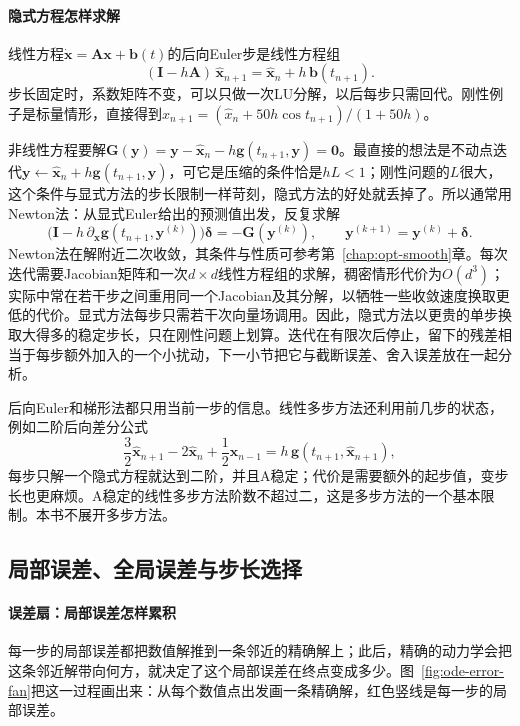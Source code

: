 \paragraph{隐式方程怎样求解}
线性方程$\dot{\bm x}=\bm A\bm x+\bm b(t)$的后向Euler步是线性方程组
\[
  (\bm I-h\bm A)\,\widehat{\bm x}_{n+1}=\widehat{\bm x}_n+h\,\bm b(t_{n+1}).
\]
步长固定时，系数矩阵不变，可以只做一次LU分解，以后每步只需回代。刚性例子是标量情形，直接得到$\widehat x_{n+1}=(\widehat x_n+50h\cos t_{n+1})/(1+50h)$。

非线性方程要解$\bm G(\bm y)=\bm y-\widehat{\bm x}_n-h\bm g(t_{n+1},\bm y)=\bm0$。最直接的想法是不动点迭代$\bm y\leftarrow\widehat{\bm x}_n+h\bm g(t_{n+1},\bm y)$，可它是压缩的条件恰是$hL<1$；刚性问题的$L$很大，这个条件与显式方法的步长限制一样苛刻，隐式方法的好处就丢掉了。所以通常用Newton法：从显式Euler给出的预测值出发，反复求解
\[
  \bigl(\bm I-h\,\partial_{\bm x}\bm g(t_{n+1},\bm y^{(k)})\bigr)\bm\delta=-\bm G(\bm y^{(k)}),\qquad\bm y^{(k+1)}=\bm y^{(k)}+\bm\delta.
\]
Newton法在解附近二次收敛，其条件与性质可参考第~\ref{chap:opt-smooth}章。每次迭代需要Jacobian矩阵和一次$d\times d$线性方程组的求解，稠密情形代价为$O(d^3)$；实际中常在若干步之间重用同一个Jacobian及其分解，以牺牲一些收敛速度换取更低的代价。显式方法每步只需若干次向量场调用。因此，隐式方法以更贵的单步换取大得多的稳定步长，只在刚性问题上划算。迭代在有限次后停止，留下的残差相当于每步额外加入的一个小扰动，下一小节把它与截断误差、舍入误差放在一起分析。

后向Euler和梯形法都只用当前一步的信息。线性多步方法还利用前几步的状态，例如二阶后向差分公式
\[
  \frac32\widehat{\bm x}_{n+1}-2\widehat{\bm x}_n+\frac12\widehat{\bm x}_{n-1}=h\,\bm g(t_{n+1},\widehat{\bm x}_{n+1}),
\]
每步只解一个隐式方程就达到二阶，并且A稳定；代价是需要额外的起步值，变步长也更麻烦。A稳定的线性多步方法阶数不超过二，这是多步方法的一个基本限制。本书不展开多步方法。

\subsection{局部误差、全局误差与步长选择}
\label{sec:ode-error-step}

\paragraph{误差扇：局部误差怎样累积}
每一步的局部误差都把数值解推到一条邻近的精确解上；此后，精确的动力学会把这条邻近解带向何方，就决定了这个局部误差在终点变成多少。图~\ref{fig:ode-error-fan}把这一过程画出来：从每个数值点出发画一条精确解，红色竖线是每一步的局部误差。

